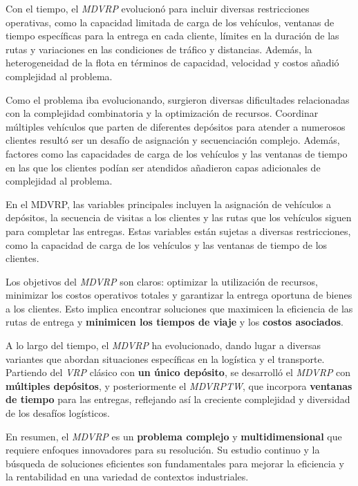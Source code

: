 \documentclass[letter, 10pt]{article}
\begin{document}
Con el tiempo, el \textit{MDVRP} evolucionó para incluir diversas restricciones operativas, como la capacidad limitada de carga de los vehículos, ventanas de tiempo específicas para la entrega en cada cliente, límites en la duración de las rutas y variaciones en las condiciones de tráfico y distancias. Además, la heterogeneidad de la flota en términos de capacidad, velocidad y costos añadió complejidad al problema.

Como el problema iba evolucionando, surgieron diversas dificultades relacionadas con la complejidad combinatoria y la optimización de recursos. Coordinar múltiples vehículos que parten de diferentes depósitos para atender a numerosos clientes resultó ser un desafío de asignación y secuenciación complejo. Además, factores como las capacidades de carga de los vehículos y las ventanas de tiempo~\cite{MDVRPTW} en las que los clientes podían ser atendidos añadieron capas adicionales de complejidad al problema.

En el MDVRP, las variables principales incluyen la asignación de vehículos a depósitos, la secuencia de visitas a los clientes y las rutas que los vehículos siguen para completar las entregas. Estas variables están sujetas a diversas restricciones, como la capacidad de carga de los vehículos y las ventanas de tiempo de los clientes.

Los objetivos del \textit{MDVRP} son claros: optimizar la utilización de recursos, minimizar los costos operativos totales y garantizar la entrega oportuna de bienes a los clientes. Esto implica encontrar soluciones que maximicen la eficiencia de las rutas de entrega y \textbf{minimicen los tiempos de viaje} y los \textbf{costos asociados}.

A lo largo del tiempo, el \textit{MDVRP} ha evolucionado, dando lugar a diversas variantes que abordan situaciones específicas en la logística y el transporte. Partiendo del \textit{VRP} clásico con \textbf{un único depósito}, se desarrolló el \textit{MDVRP} con \textbf{múltiples depósitos}, y posteriormente el \textit{MDVRPTW}, que incorpora \textbf{ventanas de tiempo} para las entregas, reflejando así la creciente complejidad y diversidad de los desafíos logísticos.

En resumen, el \textit{MDVRP} es un \textbf{problema complejo} y \textbf{multidimensional} que requiere enfoques innovadores para su resolución. Su estudio continuo y la búsqueda de soluciones eficientes son fundamentales para mejorar la eficiencia y la rentabilidad en una variedad de contextos industriales.
\end{document}

